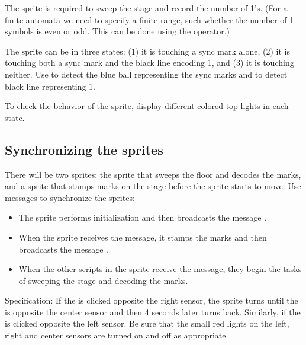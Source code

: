 The  sprite is required to sweep the stage and record the number
of 1's. (For a finite automata we need to specify a finite range, such
whether the number of 1 symbols is even or odd. This can be done using
the  operator.)

The sprite can be in three states: (1) it is touching a sync mark alone,
(2) it is touching both a sync mark and the black line encoding 1, and
(3) it is touching neither. Use  to detect
the blue ball representing the sync marks and
 to detect black line representing 1.

To check the behavior of the sprite,
display different colored top lights in each state.


\subsection*{Synchronizing the sprites}

There will be two sprites: the  sprite that sweeps the floor
and decodes the marks, and a  sprite that stamps marks on the
stage before the  sprite starts to move. Use messages to
synchronize the sprites:

\begin{itemize}
\item The  sprite performs initialization and then
broadcasts the message .
\item When the  sprite receives the  message, it stamps the
marks and then broadcasts the message .
\item When the other scripts in the  sprite receive the
 message, they begin the tasks of sweeping the stage and decoding
the marks.
\end{itemize}



Specification: If the  is clicked opposite the right sensor,
the  sprite turns until the  is opposite the center
sensor and then 4 seconds later turns back. Similarly, if the
 is clicked opposite the left sensor. Be sure that the small
red lights on the left, right and center sensors are turned on and off as
appropriate.

